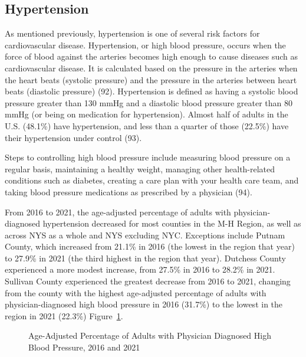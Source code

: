 \documentclass[
  english,
  letterpaper,
]{report}
\begin{document}
\subsection{Hypertension}\label{hypertension}

As mentioned previously, hypertension is one of several risk factors for
cardiovascular disease. Hypertension, or high blood pressure, occurs
when the force of blood against the arteries becomes high enough to
cause diseases such as cardiovascular disease. It is calculated based on
the pressure in the arteries when the heart beats (systolic pressure)
and the pressure in the arteries between heart beats (diastolic
pressure) (92). Hypertension is defined as having a systolic blood
pressure greater than 130 mmHg and a diastolic blood pressure greater
than 80 mmHg (or being on medication for hypertension). Almost half of
adults in the U.S. (48.1\%) have hypertension, and less than a quarter
of those (22.5\%) have their hypertension under control (93).

Steps to controlling high blood pressure include measuring blood
pressure on a regular basis, maintaining a healthy weight, managing
other health-related conditions such as diabetes, creating a care plan
with your health care team, and taking blood pressure medications as
prescribed by a physician (94).

From 2016 to 2021, the age-adjusted percentage of adults with
physician-diagnosed hypertension decreased for most counties in the M-H
Region, as well as across NYS as a whole and NYS excluding NYC.
Exceptions include Putnam County, which increased from 21.1\% in 2016
(the lowest in the region that year) to 27.9\% in 2021 (the third
highest in the region that year). Dutchess County experienced a more
modest increase, from 27.5\% in 2016 to 28.2\% in 2021. Sullivan County
experienced the greatest decrease from 2016 to 2021, changing from the
county with the highest age-adjusted percentage of adults with
physician-diagnosed high blood pressure in 2016 (31.7\%) to the lowest
in the region in 2021 (22.3\%)
Figure~\ref{fig-adult-highbp-mddx-percent}.

\begin{figure}


\caption{\label{fig-adult-highbp-mddx-percent}Age-Adjusted Percentage of
Adults with Physician Diagnosed High Blood Pressure, 2016 and 2021}

\end{figure}%
\end{document}
